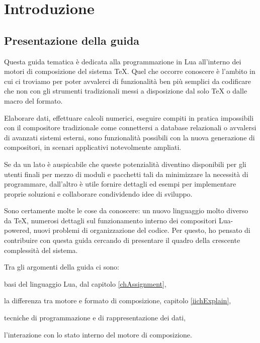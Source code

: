 

\chapter{Introduzione}

\section{Presentazione della guida}

Questa guida tematica è dedicata alla programmazione in Lua all'interno dei
motori di composizione del sistema \TeX. Quel che occorre conoscere è l'ambito
in cui ci troviamo per poter avvalerci di funzionalità ben più semplici da
codificare che non con gli strumenti tradizionali messi a disposizione dal solo
\TeX{} o dalle macro del formato.

Elaborare dati, effettuare calcoli numerici, eseguire compiti in pratica
impossibili con il compositore tradizionale come connettersi a database
relazionali o avvalersi di avanzati sistemi esterni, sono funzionalità
possibili con la nuova generazione di compositori, in scenari applicativi
notevolmente ampliati.

Se da un lato è auspicabile che queste potenzialità diventino disponibili per
gli utenti finali per mezzo di moduli e pacchetti tali da minimizzare la
necessità di programmare, dall'altro è utile fornire dettagli ed esempi per
implementare proprie soluzioni e collaborare condividendo idee di sviluppo.

Sono certamente molte le cose da conoscere: un nuovo linguaggio molto diverso da
\TeX{}, numerosi dettagli sul funzionamento interno dei compositori Lua-powered,
nuovi problemi di organizzazione del codice. Per questo, ho pensato di
contribuire con questa guida cercando di presentare il quadro della crescente
complessità del sistema.

Tra gli argomenti della guida ci sono:
\begin{compactitemize}
\item basi del linguaggio Lua, dal capitolo \ref{chAssignment},
\item la differenza tra motore e formato di composizione, capitolo \ref{iichExplain},
\item tecniche di programmazione e di rappresentazione dei dati,
\item l'interazione con lo stato interno del motore di composizione.
\end{compactitemize}

